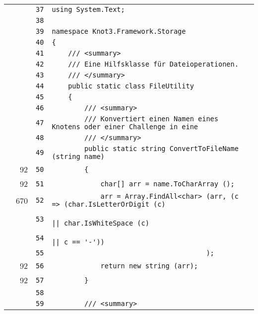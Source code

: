 \documentclass[a4paper,10pt]{article}
\begin{document}
\begin{longtable}[l]{lrrl}
\cellcolor{gray} &  & \verb~37~ & \verb~using System.Text;~\\
\cellcolor{gray} &  & \verb~38~ & \verb~~\\
\cellcolor{gray} &  & \verb~39~ & \verb~namespace Knot3.Framework.Storage~\\
\cellcolor{gray} &  & \verb~40~ & \verb~{~\\
\cellcolor{gray} &  & \verb~41~ & \verb~    /// <summary>~\\
\cellcolor{gray} &  & \verb~42~ & \verb~    /// Eine Hilfsklasse für Dateioperationen.~\\
\cellcolor{gray} &  & \verb~43~ & \verb~    /// </summary>~\\
\cellcolor{gray} &  & \verb~44~ & \verb~    public static class FileUtility~\\
\cellcolor{gray} &  & \verb~45~ & \verb~    {~\\
\cellcolor{gray} &  & \verb~46~ & \verb~        /// <summary>~\\
\cellcolor{gray} &  & \verb~47~ & \verb~        /// Konvertiert einen Namen eines Knotens oder einer Challenge in eine~\\
\cellcolor{gray} &  & \verb~48~ & \verb~        /// </summary>~\\
\cellcolor{gray} &  & \verb~49~ & \verb~        public static string ConvertToFileName (string name)~\\
\cellcolor{green} & 92 & \verb~50~ & \verb~        {~\\
\cellcolor{green} & 92 & \verb~51~ & \verb~            char[] arr = name.ToCharArray ();~\\
\cellcolor{green} & 670 & \verb~52~ & \verb~            arr = Array.FindAll<char> (arr, (c => (char.IsLetterOrDigit (c)~\\
\cellcolor{gray} &  & \verb~53~ & \verb~                                                   || char.IsWhiteSpace (c)~\\
\cellcolor{gray} &  & \verb~54~ & \verb~                                                   || c == '-'))~\\
\cellcolor{gray} &  & \verb~55~ & \verb~                                      );~\\
\cellcolor{green} & 92 & \verb~56~ & \verb~            return new string (arr);~\\
\cellcolor{green} & 92 & \verb~57~ & \verb~        }~\\
\cellcolor{gray} &  & \verb~58~ & \verb~~\\
\cellcolor{gray} &  & \verb~59~ & \verb~        /// <summary>~\\

\end{longtable}
\end{document}
